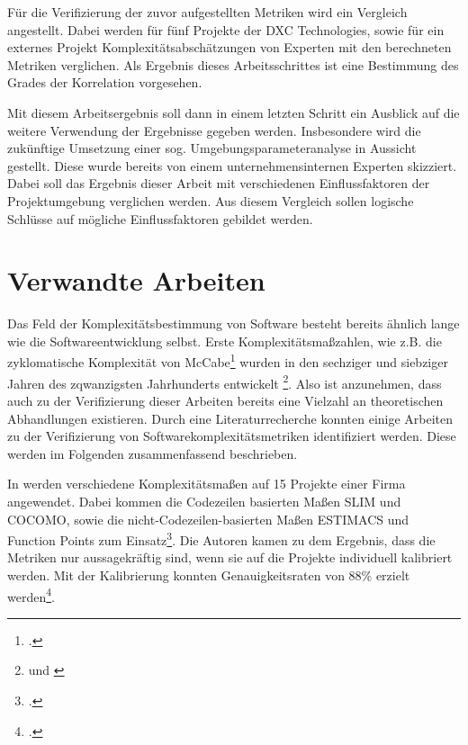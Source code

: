Für die Verifizierung der zuvor aufgestellten Metriken wird ein
Vergleich angestellt. Dabei werden für fünf Projekte der DXC
Technologies, sowie für ein externes Projekt Komplexitätsabschätzungen
von Experten mit den berechneten Metriken verglichen. Als Ergebnis
dieses Arbeitsschrittes ist eine Bestimmung des Grades der Korrelation
vorgesehen.

Mit diesem Arbeitsergebnis soll dann in einem letzten Schritt ein
Ausblick auf die weitere Verwendung der Ergebnisse gegeben werden.
Insbesondere wird die zukünftige Umsetzung einer sog.
Umgebungsparameteranalyse in Aussicht gestellt. Diese wurde bereits von
einem unternehmensinternen Experten skizziert. Dabei soll das Ergebnis
dieser Arbeit mit verschiedenen Einflussfaktoren der Projektumgebung
verglichen werden. Aus diesem Vergleich sollen logische Schlüsse auf
mögliche Einflussfaktoren gebildet werden.

\section{Verwandte Arbeiten}\label{verwandte-arbeiten}

Das Feld der Komplexitätsbestimmung von Software besteht bereits ähnlich
lange wie die Softwareentwicklung selbst. Erste
Komplexitätsmaßzahlen, wie z.B. die zyklomatische Komplexität von
McCabe\footcite[Vgl. ][]{mccabeComplexityMeasure1976} wurden in den sechziger und
siebziger Jahren des zqwanzigsten Jahrhunderts entwickelt \footnote{\cite[Vgl. ][S. 25]{zuseSoftwareComplexityMeasures1991} und \cite[][]{rubeyQuantitativeMeasurementProgram1968}}. Also ist
anzunehmen, dass auch zu der Verifizierung dieser Arbeiten bereits eine
Vielzahl an theoretischen Abhandlungen existieren. Durch eine
Literaturrecherche konnten einige Arbeiten zu der Verifizierung von
Softwarekomplexitätsmetriken identifiziert werden. Diese werden im
Folgenden zusammenfassend beschrieben.

In \cite[][]{kemererEmpiricalValidationSoftware1987} werden verschiedene
Komplexitätsmaßen auf 15 Projekte einer Firma angewendet. Dabei kommen
die Codezeilen basierten Maßen SLIM und COCOMO, sowie die
nicht-Codezeilen-basierten Maßen ESTIMACS und Function Points zum
Einsatz\footcite[Vgl. ][S. 2]{kemererEmpiricalValidationSoftware1987}. Die Autoren kamen zu dem Ergebnis, dass
die Metriken nur aussagekräftig sind, wenn sie auf die Projekte
individuell kalibriert werden. Mit der Kalibrierung konnten
Genauigkeitsraten von 88\% erzielt werden\footcite[Vgl. ][S. 12]{kemererEmpiricalValidationSoftware1987}.

